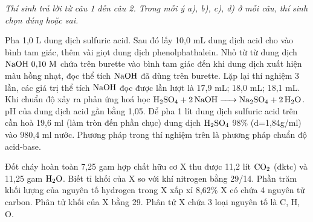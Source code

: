 \documentclass[11pt,a4paper]{article}
\begin{document}
\textit{Thí sinh trả lời từ câu 1 đến câu 2. Trong mỗi ý a), b), c), d) ở mỗi câu, thí sinh chọn đúng hoặc sai.}
\vspace{4pt}
\begin{ex}
Pha 1,0 L dung dịch sulfuric acid. Sau đó lấy 10,0 mL dung dịch acid cho vào bình tam giác, thêm vài giọt dung dịch phenolphathalein. Nhỏ từ từ dung dịch $\ce{NaOH}\ 0{,}10\text{ M}$ chứa trên burette vào bình tam giác đến khi dung dịch xuất hiện màu hồng nhạt, đọc thể tích $\ce{NaOH}$ đã dùng trên burette. Lặp lại thí nghiệm 3 lần, các giá trị thể tích $\ce{NaOH}$ đọc được lần lượt là 17,9 mL; 18,0 mL; 18,1 mL.
\choiceTF
{\True Khi chuẩn độ xảy ra phản ứng hoá học $\ce{H2SO4 + 2NaOH -> Na2SO4 + 2H2O}$.}
{\True pH của dung dịch acid gần bằng 1,05.}
{\True Để pha 1 lít dung dịch sulfuric acid trên cần hoà 19,6 ml (làm tròn đến phần chục) dung dịch $\ce{H2SO4}$ 98\% (d=1,84g/ml) vào 980,4 ml nước.}
{\True Phương pháp trong thí nghiệm trên là phương pháp chuẩn độ acid-base.}
\end{ex}
\begin{ex}
Đốt cháy hoàn toàn 7,25 gam hợp chất hữu cơ X thu được 11,2 lít $\ce{CO2}$ (đktc) và 11,25 gam $\ce{H2O}$. Biết tỉ khối của X so với khí nitrogen bằng 29/14.
\choiceTF
{\True Phần trăm khối lượng của nguyên tố hydrogen trong X xấp xỉ 8,62\%}
{\True X có chứa 4 nguyên tử carbon.}
{\True Phân tử khối của X bằng 29.}
{\True Phân tử X chứa 3 loại nguyên tố là C, H, O.}
\end{ex}
\end{document}
